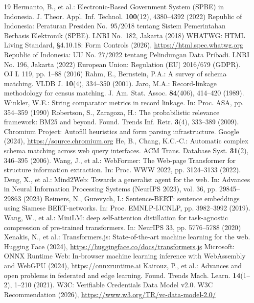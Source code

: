 \documentclass[11pt,runningheads,a4paper]{llncs}
\begin{document}
\begin{thebibliography}{19}
\scriptsize
\setlength{\itemsep}{1.2pt plus 0.4pt minus 0.2pt}
 Hermanto, B., et al.: Electronic-Based Government System (SPBE) in Indonesia. J. Theor. Appl. Inf. Technol. \textbf{100}(12), 4380--4392 (2022)
 Republic of Indonesia: Peraturan Presiden No.~95/2018 tentang Sistem Pemerintahan Berbasis Elektronik (SPBE). LNRI No.~182, Jakarta (2018)
 WHATWG: HTML Living Standard, \S4.10.18: Form Controls (2026), \url{https://html.spec.whatwg.org}
 Republic of Indonesia: UU No. 27/2022 tentang Pelindungan Data Pribadi. LNRI No. 196, Jakarta (2022)
 European Union: Regulation (EU) 2016/679 (GDPR). OJ L 119, pp. 1--88 (2016)
 Rahm, E., Bernstein, P.A.: A survey of schema matching. VLDB J. \textbf{10}(4), 334--350 (2001). 
 Jaro, M.A.: Record-linkage methodology for census matching. J. Am. Stat. Assoc. \textbf{84}(406), 414--420 (1989). 
 Winkler, W.E.: String comparator metrics in record linkage. In: Proc. ASA, pp. 354--359 (1990)
 Robertson, S., Zaragoza, H.: The probabilistic relevance framework: BM25 and beyond. Found. Trends Inf. Retr. \textbf{3}(4), 333--389 (2009). 
 Chromium Project: Autofill heuristics and form parsing infrastructure. Google (2024), \url{https://source.chromium.org}
 He, B., Chang, K.C.-C.: Automatic complex schema matching across web query interfaces. ACM Trans. Database Syst. \textbf{31}(2), 346--395 (2006). 
 Wang, J., et al.: WebFormer: The Web-page Transformer for structure information extraction. In: Proc. WWW 2022, pp. 3124--3133 (2022). 
 Deng, X., et al.: Mind2Web: Towards a generalist agent for the web. In: Advances in Neural Information Processing Systems (NeurIPS 2023), vol. 36, pp. 29845--29863 (2023)
 Reimers, N., Gurevych, I.: Sentence-BERT: sentence embeddings using Siamese BERT-networks. In: Proc. EMNLP-IJCNLP, pp. 3982--3992 (2019). 
 Wang, W., et al.: MiniLM: deep self-attention distillation for task-agnostic compression of pre-trained transformers. In: NeurIPS 33, pp. 5776--5788 (2020)
 Xenakis, N., et al.: Transformers.js: State-of-the-art machine learning for the web. Hugging Face (2024), \url{https://huggingface.co/docs/transformers.js}
 Microsoft: ONNX Runtime Web: In-browser machine learning inference with WebAssembly and WebGPU (2024), \url{https://onnxruntime.ai}
 Kairouz, P., et al.: Advances and open problems in federated and edge learning. Found. Trends Mach. Learn. \textbf{14}(1--2), 1--210 (2021). 
 W3C: Verifiable Credentials Data Model v2.0. W3C Recommendation (2026), \url{https://www.w3.org/TR/vc-data-model-2.0/}
\end{thebibliography}
\end{document}
